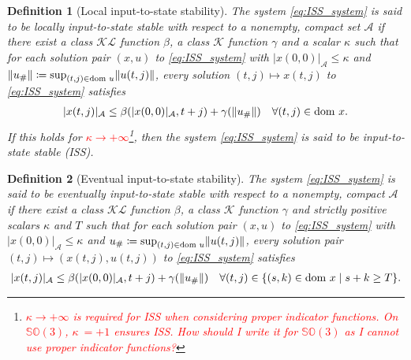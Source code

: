 \documentclass{article}
\DeclarePairedDelimiter{\norm}{\lVert}{\rVert}
\newcommand{\dom}{\text{dom }}
\newcommand{\SOthree}{\mathbb{SO}(3)}
\newtheorem{definition}{Definition}
\begin{document}
\begin{definition}[{Local input-to-state stability}]
    The system  \eqref{eq:ISS_system} is said to be locally input-to-state stable with respect to a nonempty, compact set $\mathcal{A}$ if there exist a class $\mathcal{KL}$ function $\beta$, a class $\mathcal{K}$ function $\gamma$ and a scalar $\kappa$ such that for each solution pair $(x,u)$ to \eqref{eq:ISS_system} with $|{x(0,0)}|_\mathcal{A}\leq \kappa$ and  $\norm{u_{\#}}\coloneqq  \sup_{(t,j)\in \dom u} \norm{u(t,j)}$, every solution $(t,j)\mapsto x(t,j)$ to \eqref{eq:ISS_system} satisfies
    \begin{align*}
        |x(t,j)|_\mathcal{A}\leq \beta(|x(0,0)|_\mathcal{A}, t+j) + \gamma(\norm{u_{\#}}) \quad \forall (t,j)\in \dom x.
    \end{align*}
    If this holds for \textcolor{red}{$\kappa \to +\infty$}\footnote{\textcolor{red}{$\kappa\to+\infty$ is required for ISS when considering proper indicator functions. On $\SOthree$, $\kappa\ = +1$ ensures ISS. How should I write it for $\SOthree$ as I cannot use proper indicator functions?}}, then the system \eqref{eq:ISS_system} is said to be input-to-state stable (ISS). 
\end{definition}

\begin{definition}[{Eventual input-to-state stability}]
    The system  \eqref{eq:ISS_system} is said to be eventually input-to-state stable with respect to a nonempty, compact $\mathcal{A}$ if there exist a class $\mathcal{KL}$ function $\beta$, a class $\mathcal{K}$ function $\gamma$ and strictly positive scalars $\kappa$ and $T$ such that for each solution pair $(x,u)$ to \eqref{eq:ISS_system} with $|{x(0,0)}|_\mathcal{A}\leq \kappa$ and  $u_{\#}\coloneqq \sup_{(t,j)\in \dom u} \norm{u(t,j)}$, every solution pair $(t,j)\mapsto (x(t,j),u(t,j))$ to \eqref{eq:ISS_system} satisfies
    \begin{align*}
        |x(t,j)|_\mathcal{A}\leq \beta(|x(0,0)|_\mathcal{A}, t+j) + \gamma(\norm{u_{\#}}) \quad \forall (t,j) \in  \{(s,k)\in \dom x \mid s+k \geq T\}.
    \end{align*}
\end{definition}
\end{document}
